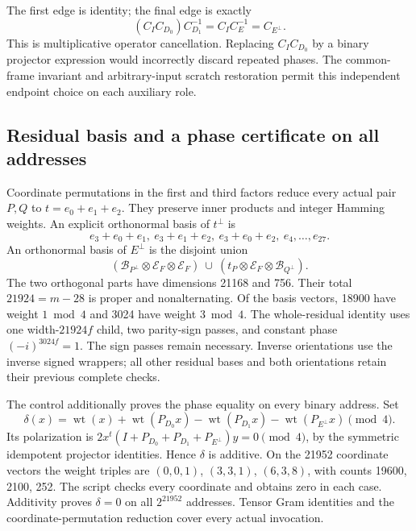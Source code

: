The first edge is identity; the final edge is exactly
\begin{equation}
 (C_I C_{D_0})C_{D_1}^{-1}=C_I C_E^{-1}=C_{E^\perp}.
 \label{eq:translated-complex-exit}
\end{equation}
This is multiplicative operator cancellation. Replacing $C_I C_{D_0}$
by a binary projector expression would incorrectly discard repeated phases.
The common-frame invariant and arbitrary-input scratch restoration permit
this independent endpoint choice on each auxiliary role.

\subsection{Residual basis and a phase certificate on all addresses}
\label{sec:translated-complex-phases}
Coordinate permutations in the first and third factors reduce every
actual pair $P,Q$ to $t=e_0+e_1+e_2$. They preserve inner products and
integer Hamming weights. An explicit orthonormal basis of $t^\perp$ is
\[
 e_3+e_0+e_1,\ e_3+e_1+e_2,\ e_3+e_0+e_2,\ e_4,\ldots,e_{27}.
\]
An orthonormal basis of $E^\perp$ is the disjoint union
\[
 (\mathcal B_{P^\perp}\otimes\mathcal E_F\otimes\mathcal E_F)
 \ \cup\ (t_P\otimes\mathcal E_F\otimes\mathcal B_{Q^\perp}).
\]
The two orthogonal parts have dimensions 21168 and 756. Their total
$21924=m-28$ is proper and nonalternating. Of the basis vectors, 18900
have weight $1\bmod4$ and 3024 have weight $3\bmod4$. The whole-residual
identity uses one width-$21924f$ child, two parity-sign passes, and
constant phase $(-i)^{3024f}=1$. The sign passes remain necessary.
Inverse orientations use the inverse signed wrappers; all other residual
bases and both orientations retain their previous complete checks.

The control additionally proves the phase equality on every binary address.
Set
\[
 \delta(x)=\operatorname{wt}(x)+\operatorname{wt}(P_{D_0}x)
 -\operatorname{wt}(P_{D_1}x)-\operatorname{wt}(P_{E^\perp}x)\pmod4.
\]
Its polarization is
$2x^t(I+P_{D_0}+P_{D_1}+P_{E^\perp})y=0\pmod4$, by the symmetric
idempotent projector identities. Hence $\delta$ is additive.
On the 21952 coordinate vectors the weight triples are $(0,0,1)$,
$(3,3,1)$, $(6,3,8)$, with counts 19600, 2100, 252. The script checks
every coordinate and obtains zero in each case. Additivity proves
$\delta=0$ on all $2^{21952}$ addresses. Tensor Gram identities and the
coordinate-permutation reduction cover every actual invocation.

